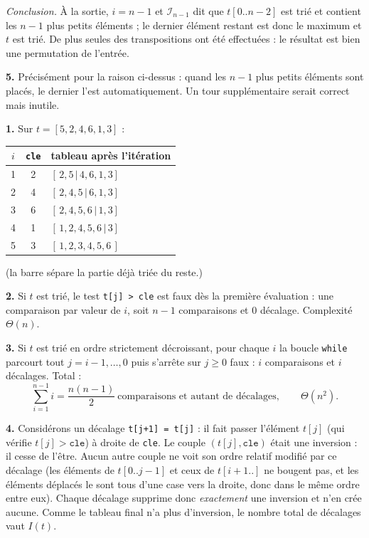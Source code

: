 \documentclass[11pt,a4paper]{article}
\begin{document}
\emph{Conclusion.} À la sortie, $i=n-1$ et $\mathcal I_{n-1}$ dit que $t[0..n-2]$ est
trié et contient les $n-1$ plus petits éléments ; le dernier élément restant est donc le
maximum et $t$ est trié. De plus seules des transpositions ont été effectuées : le
résultat est bien une permutation de l'entrée.

\textbf{5.} Précisément pour la raison ci-dessus : quand les $n-1$ plus petits éléments
sont placés, le dernier l'est automatiquement. Un tour supplémentaire serait correct mais
inutile.

\reponse
\textbf{1.} Sur $t=[5,2,4,6,1,3]$ :
\begin{center}\small
\begin{tabular}{|c|c|l|}
\hline
$i$ & \texttt{cle} & tableau après l'itération \\\hline
1 & 2 & $[\,2,5\,|\,4,6,1,3]$ \\
2 & 4 & $[\,2,4,5\,|\,6,1,3]$ \\
3 & 6 & $[\,2,4,5,6\,|\,1,3]$ \\
4 & 1 & $[\,1,2,4,5,6\,|\,3]$ \\
5 & 3 & $[\,1,2,3,4,5,6\,]$ \\\hline
\end{tabular}
\end{center}
(la barre sépare la partie déjà triée du reste.)

\textbf{2.} Si $t$ est trié, le test \texttt{t[j] > cle} est faux dès la première
évaluation : une comparaison par valeur de $i$, soit $n-1$ comparaisons et $0$ décalage.
Complexité $\Theta(n)$.

\textbf{3.} Si $t$ est trié en ordre strictement décroissant, pour chaque $i$ la boucle
\texttt{while} parcourt tout $j=i-1,\dots,0$ puis s'arrête sur $j\ge0$ faux :
$i$ comparaisons et $i$ décalages. Total :
\[
  \sum_{i=1}^{n-1} i = \frac{n(n-1)}{2}\ \text{comparaisons et autant de décalages},
  \qquad \Theta(n^{2}).
\]

\textbf{4.} Considérons un décalage \texttt{t[j+1] = t[j]} : il fait passer l'élément
$t[j]$ (qui vérifie $t[j]>\texttt{cle}$) à droite de \texttt{cle}. Le couple
$(t[j],\texttt{cle})$ était une inversion : il cesse de l'être. Aucun autre couple ne
voit son ordre relatif modifié par ce décalage (les éléments de $t[0..j-1]$ et ceux de
$t[i+1..]$ ne bougent pas, et les éléments déplacés le sont tous d'une case vers la
droite, donc dans le même ordre entre eux). Chaque décalage supprime donc \emph{exactement}
une inversion et n'en crée aucune. Comme le tableau final n'a plus d'inversion, le nombre
total de décalages vaut $I(t)$.
\end{document}
